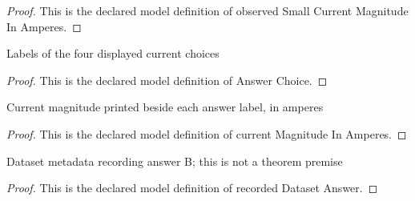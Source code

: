 \begin{proof}
  This is the declared model definition of observed Small Current Magnitude In Amperes.
\end{proof}
\begin{definition}
  \label{def:physics:phyx-mini-0974:phyxminiproblems-problemphyxmini0974-answerchoice}
  Labels of the four displayed current choices
\end{definition}
\begin{proof}
  This is the declared model definition of Answer Choice.
\end{proof}
\begin{definition}
  \label{def:physics:phyx-mini-0974:phyxminiproblems-problemphyxmini0974-answerchoice-currentmagnitudeinamperes}
  Current magnitude printed beside each answer label, in amperes
\end{definition}
\begin{proof}
  This is the declared model definition of current Magnitude In Amperes.
\end{proof}
\begin{definition}
  \label{def:physics:phyx-mini-0974:phyxminiproblems-problemphyxmini0974-recordeddatasetanswer}
  Dataset metadata recording answer B; this is not a theorem premise
\end{definition}
\begin{proof}
  This is the declared model definition of recorded Dataset Answer.
\end{proof}

